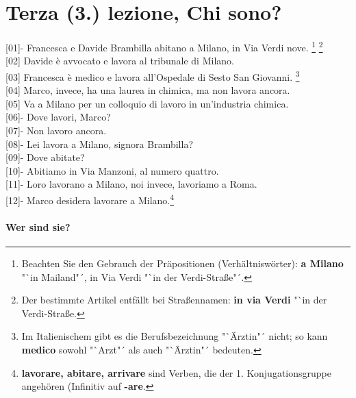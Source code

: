 \documentclass{article}
\begin{document}
\section{Terza (3.) lezione, Chi sono?}

[01]- Francesca e Davide Brambilla abitano a Milano, in Via Verdi nove.
\footnote{
Beachten Sie den Gebrauch der Präpositionen (Verhältniswörter): \textbf{
a Milano} "`in Mailand"´, in Via Verdi "`in der Verdi-Straße"´.}
\footnote{Der bestimmte Artikel entfällt bei Straßennamen: \textbf{in via
Verdi} "`in der Verdi-Straße.}
\\
{[02]} Davide è avvocato e lavora al tribunale di Milano.
\\
{[03]} Francesca è medico e lavora all'Ospedale di Sesto San Giovanni.
\footnote{Im Italienischem gibt es die
Berufsbezeichnung "`Ärztin"´ nicht; so kann \textbf{
medico} sowohl "`Arzt"´ als auch "`Ärztin"´ bedeuten.}
\\
{[04]} Marco, invece, ha una laurea in chimica, ma non lavora ancora.
\\
{[05]} Va a Milano per un colloquio di lavoro in un'industria chimica.
\\
{[06]}- Dove lavori, Marco?\\
{[07]}- Non lavoro ancora.\\
{[08]}- Lei lavora a Milano, signora Brambilla?\\
{[09]}- Dove abitate?\\
{[10]}- Abitiamo in Via Manzoni, al numero quattro.\\
{[11]}- Loro lavorano a Milano, noi invece, lavoriamo a Roma.\\
{[12]}-  Marco desidera lavorare a Milano.\footnote{\textbf{lavorare, abitare,
    arrivare} sind Verben, die der 1. Konjugationsgruppe angehören (Infinitiv
auf \textbf{-are}.}

\paragraph{Wer sind sie?}
\end{document}
